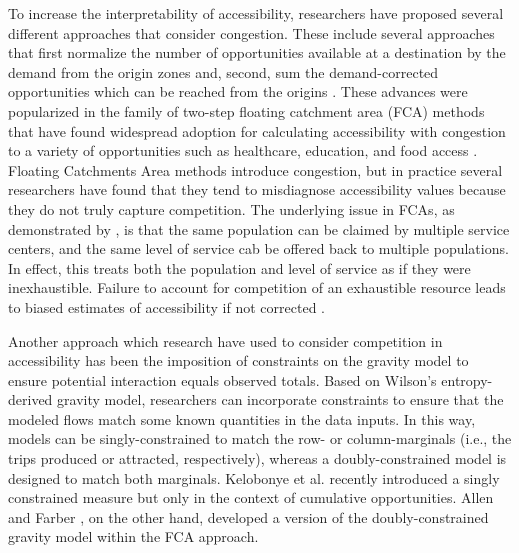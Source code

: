 \documentclass[]{elsarticle} %
\begin{document}
To increase the interpretability of accessibility, researchers have
proposed several different approaches that consider congestion. These
include several approaches that first normalize the number of
opportunities available at a destination by the demand from the origin
zones and, second, sum the demand-corrected opportunities which can be
reached from the origins \citep[e.g.][]{joseph1984, shen1998}. These
advances were popularized in the family of two-step floating catchment
area (FCA) methods \citep{luo2003} that have found widespread adoption
for calculating accessibility with congestion to a variety of
opportunities such as healthcare, education, and food access
\citep{yang_comparing_2006, chen_spatial_2020, ye_spatial_2018, chen_enhancing_2019, chen_evaluating_2020}.
Floating Catchments Area methods introduce congestion, but in practice
several researchers \citep[e.g.,][]{delamater2013spatial, wan2012three}
have found that they tend to misdiagnose accessibility values because
they do not truly capture competition. The underlying issue in FCAs, as
demonstrated by \citet{paez2019}, is that the same population can be
claimed by multiple service centers, and the same level of service cab
be offered back to multiple populations. In effect, this treats both the
population and level of service as if they were inexhaustible. Failure
to account for competition of an exhaustible resource leads to biased
estimates of accessibility if not corrected \citep{paez2019}.

Another approach which research have used to consider competition in
accessibility has been the imposition of constraints on the gravity
model to ensure potential interaction equals observed totals. Based on
Wilson's \citeyearpar{wilson1971} entropy-derived gravity model,
researchers can incorporate constraints to ensure that the modeled flows
match some known quantities in the data inputs. In this way, models can
be singly-constrained to match the row- or column-marginals (i.e., the
trips produced or attracted, respectively), whereas a doubly-constrained
model is designed to match both marginals. Kelobonye et al.
\citeyearpar{kelobonye2020measuring} recently introduced a singly
constrained measure but only in the context of cumulative opportunities.
Allen and Farber \citeyearpar{allen2019}, on the other hand, developed a
version of the doubly-constrained gravity model within the FCA approach.
\end{document}
